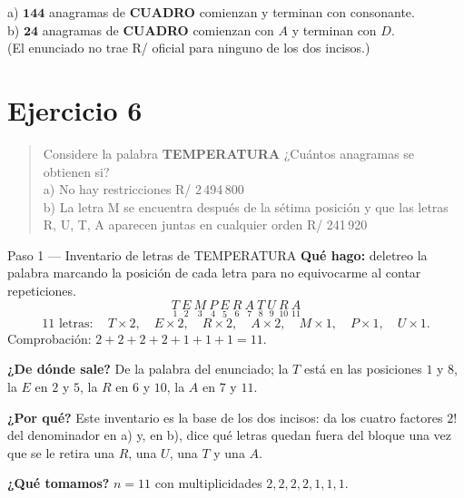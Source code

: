 \documentclass[11pt]{article}
\begin{document}
\begin{resp}
a) $\mathbf{144}$ anagramas de \textbf{CUADRO} comienzan y terminan con consonante.\\
b) $\mathbf{24}$ anagramas de \textbf{CUADRO} comienzan con $A$ y terminan con $D$.\\
(El enunciado no trae R/ oficial para ninguno de los dos incisos.)
\end{resp}

\section*{Ejercicio 6}

\begin{quote}
Considere la palabra \textbf{TEMPERATURA} ¿Cuántos anagramas se obtienen si?\\
a) No hay restricciones \hfill R/ 2\,494\,800\\
b) La letra M se encuentra después de la sétima posición y que las letras R, U, T, A aparecen juntas en
cualquier orden \hfill R/ 241\,920
\end{quote}

\begin{paso}{Paso 1 --- Inventario de letras de TEMPERATURA}
\textbf{Qué hago:} deletreo la palabra marcando la posición de cada letra para no equivocarme al contar
repeticiones.
\[
\underset{1}{T}\ \underset{2}{E}\ \underset{3}{M}\ \underset{4}{P}\ \underset{5}{E}\ \underset{6}{R}\
\underset{7}{A}\ \underset{8}{T}\ \underset{9}{U}\ \underset{10}{R}\ \underset{11}{A}
\]
\[
11 \text{ letras}:\quad T\times 2,\quad E\times 2,\quad R\times 2,\quad A\times 2,\quad
M\times 1,\quad P\times 1,\quad U\times 1 .
\]
Comprobación: $2+2+2+2+1+1+1=11$. \checkmark

\textbf{¿De dónde sale?} De la palabra del enunciado; la $T$ está en las posiciones $1$ y $8$, la $E$ en $2$
y $5$, la $R$ en $6$ y $10$, la $A$ en $7$ y $11$.

\textbf{¿Por qué?} Este inventario es la base de los dos incisos: da los cuatro factores $2!$ del
denominador en a) y, en b), dice qué letras quedan fuera del bloque una vez que se le retira una $R$, una
$U$, una $T$ y una $A$.

\textbf{¿Qué tomamos?} $n=11$ con multiplicidades $2,2,2,2,1,1,1$.
\end{paso}
\end{document}
